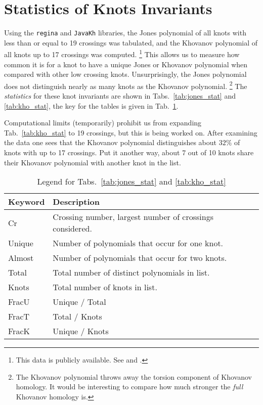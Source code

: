 \section{Statistics of Knots Invariants}
    Using the \texttt{regina} and \texttt{JavaKh} libraries, the Jones
    polynomial of all knots with less than or equal to 19 crossings was
    tabulated, and the Khovanov polynomial of all knots up to 17 crossings
    was computed.%
    \footnote{%
        This data is publicly available. See
        \cite{JonesData} and \cite{KhovanovData}.
    }
    This allows us to measure how common it is for a knot
    to have a unique Jones or Khovanov polynomial when compared with other
    low crossing knots. Unsurprisingly, the Jones polynomial does not
    distinguish nearly as many knots as the Khovanov polynomial.%
    \footnote{%
        The Khovanov polynomial throws away the torsion component of
        Khovanov homology. It would be interesting to compare how much
        stronger the \textit{full} Khovanov homology is.
    }
    The \textit{statistics} for these knot invariants are shown in
    Tabs.~\ref{tab:jones_stat} and \ref{tab:kho_stat}, the key for the
    tables is given in Tab.~\ref{tab:key}.
    \par\hfill\par
    Computational limits (temporarily) prohibit us from expanding
    Tab.~\ref{tab:kho_stat} to 19 crossings, but this is being worked on.
    After examining the data one sees that the Khovanov polynomial
    distinguishes about $32\%$ of knots with up to 17 crossings. Put it
    another way, about 7 out of 10 knots share their Khovanov polynomial
    with another knot in the list.
    \begin{table}
        \centering
        \begin{tabular}{| l | l |}
            \hline
            Keyword & Description\\
            \hline
            Cr     & Crossing number, largest number of crossings considered.\\
            Unique & Number of polynomials that occur for one knot.\\
            Almost & Number of polynomials that occur for two knots.\\
            Total  & Total number of distinct polynomials in list.\\
            Knots  & Total number of knots in list.\\
            FracU  & Unique / Total\\
            FracT  & Total / Knots\\
            FracK  & Unique / Knots\\
            \hline
        \end{tabular}
        \caption{Legend for Tabs.~\ref{tab:jones_stat} and \ref{tab:kho_stat}}
        \label{tab:key}
    \end{table}
